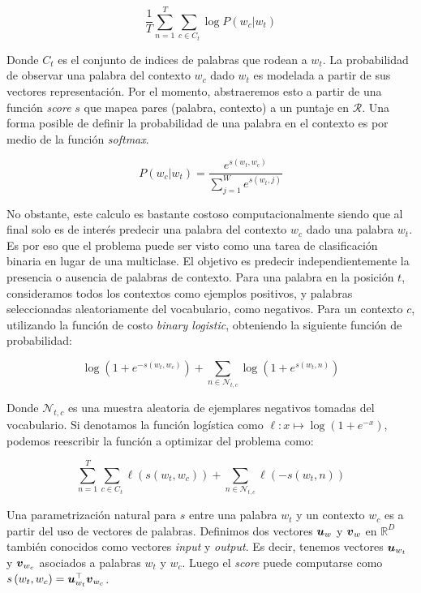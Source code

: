 \begin{equation} \label{eq:skipgram-ideal}
    \frac{1}{T} \sum_{n=1}^{T}
                    \sum_{c \in C_t} \log P(w_c | w_t)
\end{equation}

Donde $C_t$ es el conjunto de indices de palabras que rodean a $w_t$. La
probabilidad de observar una palabra del contexto $w_c$ dado $w_t$ es modelada a
partir de sus vectores representación. Por el momento, abstraeremos esto a
partir de una función \emph{score} $s$ que mapea pares (palabra, contexto) a un
puntaje en $\mathcal{R}$. Una forma posible de definir la probabilidad de una palabra en
el contexto es por medio de la función \emph{softmax}.

\begin{equation} \label{eq:skipram-softmax}
    P(w_{c}|w_{t}) = \frac{e^{s(w_t, w_c)}}{\sum_{j=1}^{W} e^{s(w_t, j)}}
\end{equation}

No obstante, este calculo es bastante costoso computacionalmente siendo que al
final solo es de interés predecir una palabra del contexto $w_c$ dado una
palabra $w_t$. Es por eso que el problema puede ser visto como una tarea de
clasificación binaria en lugar de una multiclase. El objetivo es predecir
independientemente la presencia o ausencia de palabras de contexto. Para una
palabra en la posición $t$, consideramos todos los contextos como ejemplos
positivos, y palabras seleccionadas aleatoriamente del vocabulario, como
negativos. Para un contexto $c$, utilizando la función de costo \emph{binary
logistic}, obteniendo la siguiente función de probabilidad:

\begin{equation}
    \log\left( 1 + e^{-s(w_t, w_c)} \right) +
    \sum_{n \in \mathcal{N}_{t, c}} \log\left( 1 + e^{s(w_t, n)} \right)
\end{equation}

Donde $\mathcal{N}_{t, c}$ es una muestra aleatoria de ejemplares negativos
tomadas del vocabulario. Si denotamos la función logística como $\ell: x \mapsto
\log \left(1 + e^{-x} \right)$, podemos reescribir la función a optimizar del
problema como:

\begin{equation}
    \sum_{n=1}^{T} 
        \sum_{c \in C_t} \ell\left(s(w_t, w_c)\right) +
        \sum_{n \in \mathcal{N}_{t, c}} \ell\left(-s(w_t, n) \right)
\end{equation}

Una parametrización natural para $s$ entre una palabra $w_t$ y un contexto $w_c$
es a partir del uso de vectores de palabras. Definimos dos vectores $\boldsymbol{u}_w$
y $\boldsymbol{v}_w$ en $\mathbb{R}^D$ también conocidos como vectores \emph{input} y
\emph{output}. Es decir, tenemos vectores $\boldsymbol{u}_{w_t}$ y $\boldsymbol{v}_{w_c}$
asociados a palabras $w_t$ y $w_c$. Luego el \emph{score} puede computarse como
$s\left( w_t, w_c \right) = \boldsymbol{u}_{w_t}^\top \boldsymbol{v}_{w_c}$.

